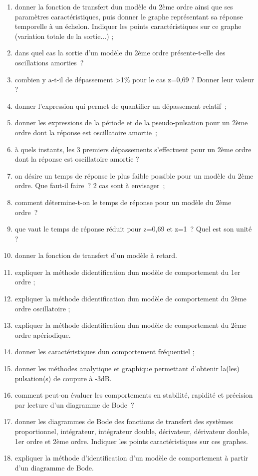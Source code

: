 \begin{enumerate}
\item donner la fonction de transfert d\textquotesingle un modèle du 2ème ordre ainsi que ses paramètres caractéristiques, puis donner le graphe représentant sa réponse temporelle à un échelon. Indiquer les points caractéristiques sur ce graphe (variation totale de la sortie...) ;
\item dans quel cas la sortie d'un modèle du 2ème ordre présente-t-elle des oscillations amorties~?
\item combien y a-t-il de dépassement \textgreater1\% pour le cas z=0,69 ? Donner leur valeur ?
\item donner l'expression qui permet de quantifier un dépassement relatif~;
\item donner les expressions de la période et de la pseudo-pulsation pour un 2ème ordre dont la réponse est oscillatoire amortie~;
\item à quels instants, les 3 premiers dépassements s'effectuent pour un 2ème ordre dont la réponse est oscillatoire amortie ?
\item on désire un temps de réponse le plus faible possible pour un modèle du 2ème ordre. Que faut-il faire~? 2 cas sont à envisager~;
\item comment détermine-t-on le temps de réponse pour un modèle du 2ème ordre~?
\item que vaut le temps de réponse réduit pour z=0,69 et z=1~? Quel est son unité ?
\item donner la fonction de transfert d'un modèle à retard.
\item expliquer la méthode d\textquotesingle identification d\textquotesingle un modèle de comportement du 1er ordre ;
\item expliquer la méthode d\textquotesingle identification d\textquotesingle un modèle de comportement du 2ème ordre oscillatoire ;
\item expliquer la méthode d\textquotesingle identification d\textquotesingle un modèle de comportement du 2ème ordre apériodique.
\item donner les caractéristiques d\textquotesingle un comportement fréquentiel ;
\item donner les méthodes analytique et graphique permettant d'obtenir la(les) pulsation(s) de coupure à -3dB.
\item comment peut-on évaluer les comportements en stabilité, rapidité et précision par lecture d'un diagramme de Bode~?
\item donner les diagrammes de Bode des fonctions de transfert des systèmes proportionnel, intégrateur, intégrateur double, dérivateur, dérivateur double, 1er ordre et 2ème ordre. Indiquer les points caractéristiques sur ces graphes.
\item expliquer la méthode d'identification d'un modèle de comportement à partir d'un diagramme de Bode.
\end{enumerate}
